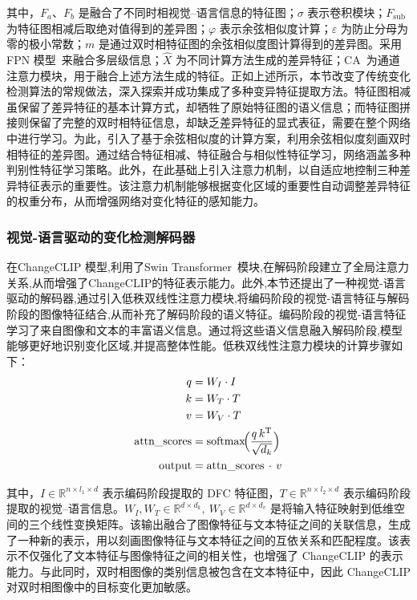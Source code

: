 其中，$F_a$、$F_b$ 是融合了不同时相视觉–语言信息的特征图；$\sigma$ 表示卷积模块；$F_{\mathrm{sub}}$ 为特征图相减后取绝对值得到的差异图；$\varphi$ 表示余弦相似度计算；$\varepsilon$ 为防止分母为零的极小常数；$m$ 是通过双时相特征图的余弦相似度图计算得到的差异图。采用 FPN 模型~\cite{lin_feature_2017}来融合多层级信息；$\hat X$ 为不同计算方法生成的差异特征；CA~\cite{Hu2017SqueezeandExcitationN}为通道注意力模块，用于融合上述方法生成的特征。正如上述所示，本节改变了传统变化检测算法的常规做法，深入探索并成功集成了多种变异特征提取方法。特征图相减虽保留了差异特征的基本计算方式，却牺牲了原始特征图的语义信息；而特征图拼接则保留了完整的双时相特征信息，却缺乏差异特征的显式表征，需要在整个网络中进行学习。为此，引入了基于余弦相似度的计算方案，利用余弦相似度刻画双时相特征的差异图。通过结合特征相减、特征融合与相似性特征学习，网络涵盖多种判别性特征学习策略。此外，在此基础上引入注意力机制，以自适应地控制三种差异特征表示的重要性。该注意力机制能够根据变化区域的重要性自动调整差异特征的权重分布，从而增强网络对变化特征的感知能力。

\subsubsection{视觉-语言驱动的变化检测解码器}

在ChangeCLIP 模型,利用了Swin Transformer~\cite{Liu2021SwinTH}模块,在解码阶段建立了全局注意力关系,从而增强了ChangeCLIP的特征表示能力。此外,本节还提出了一种视觉-语言驱动的解码器,通过引入低秩双线性注意力模块,将编码阶段的视觉-语言特征与解码阶段的图像特征结合,从而补充了解码阶段的语义特征。编码阶段的视觉-语言特征学习了来自图像和文本的丰富语义信息。通过将这些语义信息融入解码阶段,模型能够更好地识别变化区域,并提高整体性能。低秩双线性注意力模块的计算步骤如下：
\begin{align}
q &= W_I \cdot I \label{eq:changeclip-18}\\
k &= W_T \cdot T \label{eq:changeclip-19}\\
v &= W_V \cdot T \label{eq:changeclip-20}\\
\mathrm{attn\_scores} &= \mathrm{softmax}\!\Bigl(\frac{q\,k^{\mathrm{T}}}{\sqrt{d_k}}\Bigr) \label{eq:changeclip-21}\\
\mathrm{output} &= \mathrm{attn\_scores}\,\cdot\,v \label{eq:changeclip-22}
\end{align}

其中，\(I\in\mathbb{R}^{n\times l_1\times d}\) 表示编码阶段提取的 DFC 特征图，\(T\in\mathbb{R}^{n\times l_2\times d}\) 表示编码阶段提取的视觉–语言信息。\(W_I, W_T\in\mathbb{R}^{d\times d_k},\ W_V\in\mathbb{R}^{d\times d_v}\) 是将输入特征映射到低维空间的三个线性变换矩阵。该输出融合了图像特征与文本特征之间的关联信息，生成了一种新的表示，用以刻画图像特征与文本特征之间的互依关系和匹配程度。该表示不仅强化了文本特征与图像特征之间的相关性，也增强了 ChangeCLIP 的表示能力。与此同时，双时相图像的类别信息被包含在文本特征中，因此 ChangeCLIP 对双时相图像中的目标变化更加敏感。

